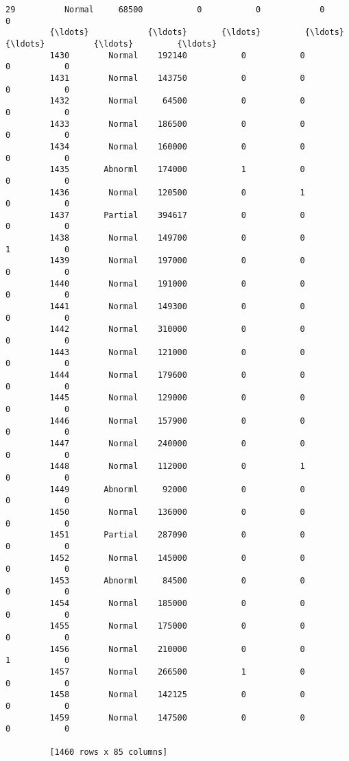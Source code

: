 \documentclass[11pt]{article}
\begin{document}
\begin{Verbatim}[commandchars=\\\{\}]
         29          Normal     68500           0           0            0           0  
         {\ldots}            {\ldots}       {\ldots}         {\ldots}         {\ldots}          {\ldots}         {\ldots}  
         1430        Normal    192140           0           0            0           0  
         1431        Normal    143750           0           0            0           0  
         1432        Normal     64500           0           0            0           0  
         1433        Normal    186500           0           0            0           0  
         1434        Normal    160000           0           0            0           0  
         1435       Abnorml    174000           1           0            0           0  
         1436        Normal    120500           0           1            0           0  
         1437       Partial    394617           0           0            0           0  
         1438        Normal    149700           0           0            1           0  
         1439        Normal    197000           0           0            0           0  
         1440        Normal    191000           0           0            0           0  
         1441        Normal    149300           0           0            0           0  
         1442        Normal    310000           0           0            0           0  
         1443        Normal    121000           0           0            0           0  
         1444        Normal    179600           0           0            0           0  
         1445        Normal    129000           0           0            0           0  
         1446        Normal    157900           0           0            0           0  
         1447        Normal    240000           0           0            0           0  
         1448        Normal    112000           0           1            0           0  
         1449       Abnorml     92000           0           0            0           0  
         1450        Normal    136000           0           0            0           0  
         1451       Partial    287090           0           0            0           0  
         1452        Normal    145000           0           0            0           0  
         1453       Abnorml     84500           0           0            0           0  
         1454        Normal    185000           0           0            0           0  
         1455        Normal    175000           0           0            0           0  
         1456        Normal    210000           0           0            1           0  
         1457        Normal    266500           1           0            0           0  
         1458        Normal    142125           0           0            0           0  
         1459        Normal    147500           0           0            0           0  
         
         [1460 rows x 85 columns]
\end{Verbatim}
            
\end{document}
